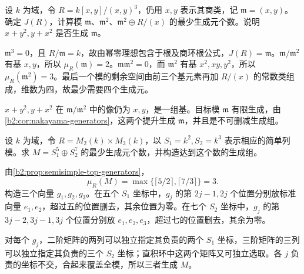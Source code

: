 \begin{exercise}\label{b2:ex:14-local-generator-computation}
	设 \(k\) 为域，令 \(R=k[x,y]/(x,y)^3\)，仍用 \(x,y\) 表示其商类，记 \(\mathfrak m=(x,y)\)。确定 \(J(R)\)，计算模 \(\mathfrak m\)、\(\mathfrak m^2\)、\(\mathfrak m^2\oplus R/(x)\) 的最少生成元个数。说明 \(x+y^2,y+x^2\) 是否生成 \(\mathfrak m\)。
\end{exercise}
\begin{solution}
	\(\mathfrak m^3=0\)，且 \(R/\mathfrak m=k\)，故由幂零理想包含于根及商环根公式，\(J(R)=\mathfrak m\)。\(\mathfrak m/\mathfrak m^2\) 有基 \(x,y\)，所以 \(\mu_R(\mathfrak m)=2\)。\(\mathfrak m\mathfrak m^2=0\)，而 \(\mathfrak m^2\) 有基 \(x^2,xy,y^2\)，所以 \(\mu_R(\mathfrak m^2)=3\)。最后一个模的剩余空间由前三个基元素再加 \(R/(x)\) 的常数类组成，维数为四，故最少需要四个生成元。

	\(x+y^2,y+x^2\) 在 \(\mathfrak m/\mathfrak m^2\) 中的像仍为 \(x,y\)，是一组基。目标模 \(\mathfrak m\) 有限生成，由\cref{b2:cor:nakayama-generators}，这两个提升生成 \(\mathfrak m\)，并且是不可删减生成组。
\end{solution}

\begin{exercise}\label{b2:ex:14-semisimple-generator-packing}
	设 \(k\) 为域，令 \(R=M_2(k)\times M_3(k)\)，以 \(S_1=k^2,S_2=k^3\) 表示相应的简单列模。求 \(M=S_1^5\oplus S_2^7\) 的最少生成元个数，并构造达到这个数的生成组。
\end{exercise}
\begin{solution}
	由\cref{b2:prop:semisimple-top-generators}，
	\[
		\mu_R(M)=\max\{\lceil5/2\rceil,\lceil7/3\rceil\}=3.
	\]
	构造三个向量 \(g_1,g_2,g_3\)。在五个 \(S_1\) 坐标中，\(g_j\) 的第 \(2j-1,2j\) 个位置分别放标准向量 \(e_1,e_2\)，超过五的位置删去，其余位置为零。在七个 \(S_2\) 坐标中，\(g_j\) 的第 \(3j-2,3j-1,3j\) 个位置分别放 \(e_1,e_2,e_3\)，超过七的位置删去，其余为零。

	对每个 \(g_j\)，二阶矩阵的两列可以独立指定其负责的两个 \(S_1\) 坐标，三阶矩阵的三列可以独立指定其负责的三个 \(S_2\) 坐标；直积环中这两个矩阵又可独立选取。各 \(j\) 负责的坐标不交，合起来覆盖全模，所以三者生成 \(M\)。
\end{solution}

